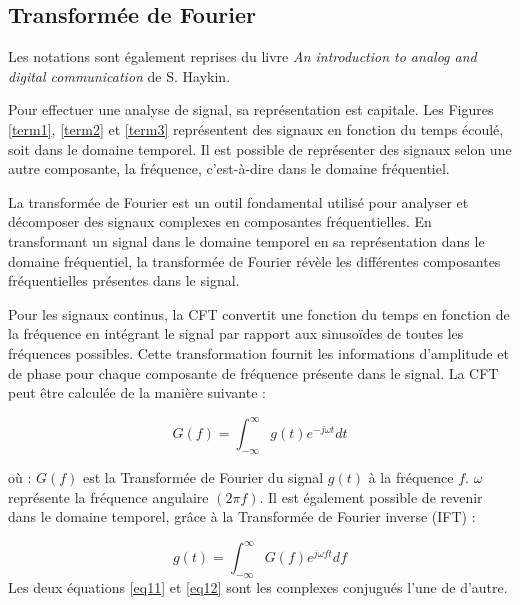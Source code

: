 \subsection{Transformée de Fourier}

Les notations sont également reprises du livre \textit{An introduction to analog and digital communication} de S. Haykin\cite{book1}.

\vspace{0.1cm}

Pour effectuer une analyse de signal, sa représentation est capitale. Les Figures \ref{term1}, \ref{term2} et \ref{term3} représentent des signaux en fonction du temps écoulé, soit dans le domaine temporel. Il est possible de représenter des signaux selon une autre composante, la fréquence, c'est-à-dire dans le domaine fréquentiel.

\vspace{0.1cm}

La transformée de Fourier est un outil fondamental utilisé pour analyser et décomposer des signaux complexes en composantes fréquentielles. En transformant un signal dans le domaine temporel en sa représentation dans le domaine fréquentiel, la transformée de Fourier révèle les différentes composantes fréquentielles présentes dans le signal.

\vspace{0.1cm}

Pour les signaux continus, la \ac{CFT} convertit une fonction du temps en fonction de la fréquence en intégrant le signal par rapport aux sinusoïdes de toutes les fréquences possibles. Cette transformation fournit les informations d'amplitude et de phase pour chaque composante de fréquence présente dans le signal. La \ac{CFT} peut être calculée de la manière suivante :  

\begin{equation}\label{eq11}
G(f) = \int_{-\infty}^{\infty} g(t)e^{-j\omega t} dt
\end{equation}

où : $G(f)$ est la Transformée de Fourier du signal $g(t)$ à la fréquence $f$. $\omega$ représente la fréquence angulaire $(2 \pi f)$.
Il est également possible de revenir dans le domaine temporel, grâce à la Transformée de Fourier inverse (IFT) :

\begin{equation}\label{eq12}
g(t) = \int_{-\infty}^{\infty} G(f)e^{j\omega ft} df
\end{equation}
Les deux équations \ref{eq11} et \ref{eq12} sont les complexes conjugués l'une de d'autre.

